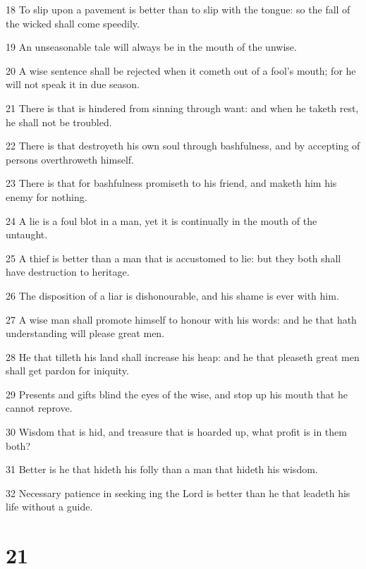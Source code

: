 \par 18 To slip upon a pavement is better than to slip with the tongue: so the fall of the wicked shall come speedily.
\par 19 An unseasonable tale will always be in the mouth of the unwise.
\par 20 A wise sentence shall be rejected when it cometh out of a fool's mouth; for he will not speak it in due season.
\par 21 There is that is hindered from sinning through want: and when he taketh rest, he shall not be troubled.
\par 22 There is that destroyeth his own soul through bashfulness, and by accepting of persons overthroweth himself.
\par 23 There is that for bashfulness promiseth to his friend, and maketh him his enemy for nothing.
\par 24 A lie is a foul blot in a man, yet it is continually in the mouth of the untaught.
\par 25 A thief is better than a man that is accustomed to lie: but they both shall have destruction to heritage.
\par 26 The disposition of a liar is dishonourable, and his shame is ever with him.
\par 27 A wise man shall promote himself to honour with his words: and he that hath understanding will please great men.
\par 28 He that tilleth his land shall increase his heap: and he that pleaseth great men shall get pardon for iniquity.
\par 29 Presents and gifts blind the eyes of the wise, and stop up his mouth that he cannot reprove.
\par 30 Wisdom that is hid, and treasure that is hoarded up, what profit is in them both?
\par 31 Better is he that hideth his folly than a man that hideth his wisdom.
\par 32 Necessary patience in seeking ing the Lord is better than he that leadeth his life without a guide.

\chapter{21}

